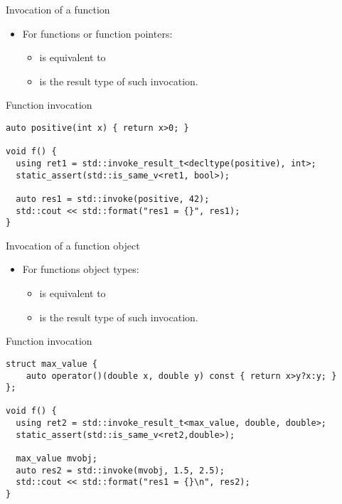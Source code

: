 \begin{frame}[t,fragile]{Invocation of a function}
\begin{itemize}
  \item For functions or function pointers:
    \begin{itemize}
      \item {}
            is equivalent to 
      \item {}
            is the result type of such invocation.
    \end{itemize}
\end{itemize}
\begin{block}{Function invocation}
\begin{lstlisting}
auto positive(int x) { return x>0; }

void f() {
  using ret1 = std::invoke_result_t<decltype(positive), int>;
  static_assert(std::is_same_v<ret1, bool>);

  auto res1 = std::invoke(positive, 42);
  std::cout << std::format("res1 = {}", res1);
}
\end{lstlisting}
\end{block}
\end{frame}

\begin{frame}[t,fragile]{Invocation of a function object}
\begin{itemize}
  \item For functions object types:
    \begin{itemize}
      \item {}
            is equivalent to 
      \item {}
            is the result type of such invocation.
    \end{itemize}
\end{itemize}
\begin{block}{Function invocation}
\begin{lstlisting}[basicstyle=\tiny]
struct max_value {
    auto operator()(double x, double y) const { return x>y?x:y; }
};

void f() {
  using ret2 = std::invoke_result_t<max_value, double, double>;
  static_assert(std::is_same_v<ret2,double>);

  max_value mvobj;
  auto res2 = std::invoke(mvobj, 1.5, 2.5);
  std::cout << std::format("res1 = {}\n", res2);
}
\end{lstlisting}
\end{block}
\end{frame}

